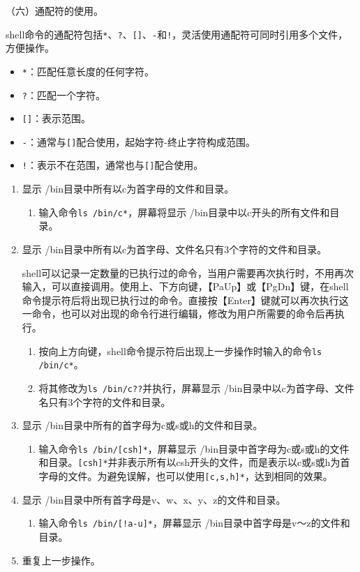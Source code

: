\vspace{0.1in}
（六）通配符的使用。

shell命令的通配符包括\verb|*|、\verb|?|、\verb|[]|、\verb|-|和\verb|!|，灵活使用通配符可同时引用多个文件，方便操作。
\begin{itemize}
  \item \verb|*|：匹配任意长度的任何字符。
  \item \verb|?|：匹配一个字符。
  \item \verb|[]|：表示范围。
  \item \verb|-|：通常与\verb|[]|配合使用，起始字符-终止字符构成范围。
  \item \verb|!|：表示不在范围，通常也与\verb|[]|配合使用。
\end{itemize}
\begin{enumerate}
  \item 显示 /bin目录中所有以c为首字母的文件和目录。
    \begin{enumerate}
      \item 输入命令\verb|ls /bin/c*|，屏幕将显示 /bin目录中以c开头的所有文件和目录。
    \end{enumerate}
  \item 显示 /bin目录中所有以c为首字母、文件名只有3个字符的文件和目录。

    shell可以记录一定数量的已执行过的命令，当用户需要再次执行时，不用再次输入，可以直接调用。使用上、下方向键，【PaUp】或【PgDn】键，在shell命令提示符后将出现已执行过的命令。直接按【Enter】键就可以再次执行这一命令，也可以对出现的命令行进行编辑，修改为用户所需要的命令后再执行。
    \begin{enumerate}
      \item 按向上方向键，shell命令提示符后出现上一步操作时输入的命令\verb|ls /bin/c*|。
      \item 将其修改为\verb|ls /bin/c??|并执行，屏幕显示 /bin目录中以c为首字母、文件名只有3个字符的文件和目录。
    \end{enumerate}
  \item 显示 /bin目录中所有的首字母为c或s或h的文件和目录。
    \begin{enumerate}
      \item 输入命令\verb|ls /bin/[csh]*|，屏幕显示 /bin目录中首字母为c或s或h的文件和目录。\verb|[csh]*|并非表示所有以csh开头的文件，而是表示以c或s或h为首字母的文件。为避免误解，也可以使用\verb|[c,s,h]*|，达到相同的效果。
    \end{enumerate}
  \item 显示 /bin目录中所有首字母是v、w、x、y、z的文件和目录。
    \begin{enumerate}
      \item 输入命令\verb|ls /bin/[!a-u]*|，屏幕显示 /bin目录中首字母是v～z的文件和目录。
    \end{enumerate}
  \item 重复上一步操作。
    

\end{enumerate}
